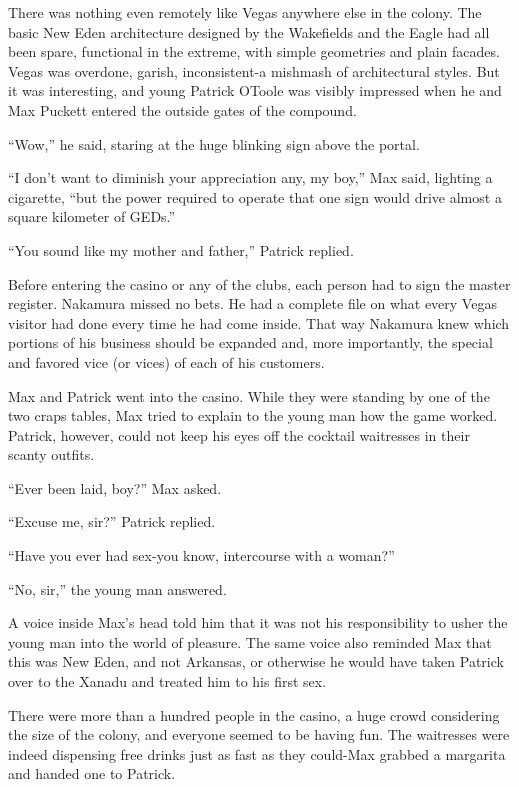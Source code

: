\documentclass[]{article}
\begin{document}
{There was nothing even remotely like Vegas anywhere else in the colony.  The basic New Eden architecture designed by the Wakefields and the Eagle had all been spare, functional in the extreme, with simple geometries and plain facades.  Vegas was overdone, garish, inconsistent-a mishmash of architectural styles.  But it was interesting, and young Patrick OToole was visibly impressed when he and Max Puckett entered the outside gates of the compound.

“Wow,” he said, staring at the huge blinking sign above the portal.

“I don’t want to diminish your appreciation any, my boy,” Max said, lighting a cigarette, “but the power required to operate that one sign would drive almost a square kilometer of GEDs.”

“You sound like my mother and father,” Patrick replied.

Before entering the casino or any of the clubs, each person had to sign the master register.  Nakamura missed no bets.  He had a complete file on what every Vegas visitor had done every time he had come inside.  That way Nakamura knew which portions of his business should be expanded and, more importantly, the special and favored vice (or vices) of each of his customers.

Max and Patrick went into the casino.  While they were standing by one of the two craps tables, Max tried to explain to the young man how the game worked.  Patrick, however, could not keep his eyes off the cocktail waitresses in their scanty outfits.

“Ever been laid, boy?” Max asked.

“Excuse me, sir?” Patrick replied.

“Have you ever had sex-you know, intercourse with a woman?”

“No, sir,” the young man answered.

A voice inside Max’s head told him that it was not his responsibility to usher the young man into the world of pleasure.  The same voice also reminded Max that this was New Eden, and not Arkansas, or otherwise he would have taken Patrick over to the Xanadu and treated him to his first sex.

There were more than a hundred people in the casino, a huge crowd considering the size of the colony, and everyone seemed to be having fun.  The waitresses were indeed dispensing free drinks just as fast as they could-Max grabbed a margarita and handed one to Patrick.

}
\end{document}
